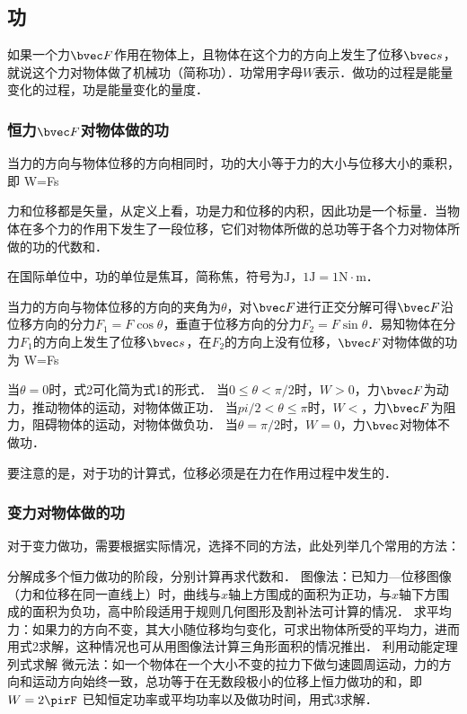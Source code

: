 
\begin{issues}
\issueDraft
\issueTODO
\end{issues}

\subsection{功}

如果一个力$\bvec F$作用在物体上，且物体在这个力的方向上发生了位移$\bvec s$，就说这个力对物体做了机械功（简称功）．功常用字母$W$表示．做功的过程是能量变化的过程，功是能量变化的量度．

\subsubsection{恒力$\bvec F$对物体做的功}

当力的方向与物体位移的方向相同时，功的大小等于力的大小与位移大小的乘积，即
W=Fs

力和位移都是矢量，从定义上看，功是力和位移的内积，因此功是一个标量．当物体在多个力的作用下发生了一段位移，它们对物体所做的总功等于各个力对物体所做的功的代数和．

在国际单位中，功的单位是焦耳，简称焦，符号为$\mathrm{J}$，$1\mathrm{J}=1\mathrm{N \cdot m}$．

当力的方向与物体位移的方向的夹角为$\theta$，对$\bvec F$进行正交分解可得$\bvec F$沿位移方向的分力$F_1=F\cos \theta$，垂直于位移方向的分力$F_2=F\sin \theta$．易知物体在分力$F_1$的方向上发生了位移$\bvec s$，在$F_2$的方向上没有位移，$\bvec F$对物体做的功为
W=Fs\cos \theta

当$\theta = 0$时，式2可化简为式1的形式．
当$0\leq \theta < \pi/2$时，$W>0$，力$\bvec F$为动力，推动物体的运动，对物体做正功．
当$pi/2< \theta \leq \pi$时，$W<$，力$\bvec F$为阻力，阻碍物体的运动，对物体做负功．
当$\theta = \pi/2$时，$W=0$，力$\bvec$对物体不做功．

要注意的是，对于功的计算式，位移必须是在力在作用过程中发生的．

\subsubsection{变力对物体做的功}

对于变力做功，需要根据实际情况，选择不同的方法，此处列举几个常用的方法：

分解成多个恒力做功的阶段，分别计算再求代数和．
图像法：已知力—位移图像（力和位移在同一直线上）时，曲线与$x$轴上方围成的面积为正功，与$x$轴下方围成的面积为负功，高中阶段适用于规则几何图形及割补法可计算的情况．
求平均力：如果力的方向不变，其大小随位移均匀变化，可求出物体所受的平均力，进而用式2求解，这种情况也可从用图像法计算三角形面积的情况推出．
利用动能定理列式求解
微元法：如一个物体在一个大小不变的拉力下做匀速圆周运动，力的方向和运动方向始终一致，总功等于在无数段极小的位移上恒力做功的和，即$W=2\pirF$
已知恒定功率或平均功率以及做功时间，用式3求解．
